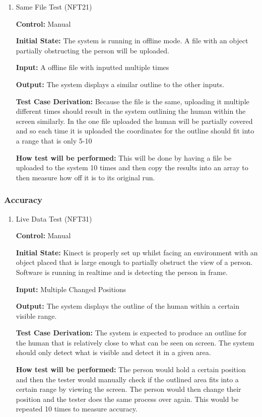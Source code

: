 \documentclass[12pt, titlepage]{article}
\begin{document}
\begin{enumerate}

\item{Same File Test (NFT21)\label{NFT21}\\}
  
\textbf{Control:} Manual

\textbf{Initial State:} The system is running in offline mode. A file with an object partially obstructing the person will be uploaded.

\textbf{Input:} A offline file with inputted multiple times

\textbf{Output:} The system displays a similar outline to the other inputs.

\textbf{Test Case Derivation:} Because the file is the same, uploading it multiple different times should result in the system outlining the human within the screen similarly. In the one file uploaded the human will be partially covered and so each time it is uploaded the coordinates for the outline should fit into a range that is only 5-10%

\textbf{How test will be performed:} This will be done by having a file be uploaded to the system 10 times and then copy the results into an array to then measure how off it is to its original run. 
  
\end{enumerate}

\subsubsection{Accuracy}

\begin{enumerate}

\item{Live Data Test (NFT31)\label{NFT31}\\}

\textbf{Control:} Manual

\textbf{Initial State:} Kinect is properly set up whilst facing an environment with an object placed that is large enough to partially obstruct the view of a person. Software is running in realtime and is detecting the person in frame.

\textbf{Input:} Multiple Changed Positions

\textbf{Output:} The system displays the outline of the human within a certain visible range.

\textbf{Test Case Derivation:} The system is expected to produce an outline for the human that is relatively close to what can be seen on screen. The system should only detect what is visible and detect it in a given area.

\textbf{How test will be performed:} The person would hold a certain position and then the tester would manually check if the outlined area fits into a certain range by viewing the screen. The person would then change their position and the tester does the same process over again. This would be repeated 10 times to measure accuracy.
  
\end{enumerate}
\end{document}
